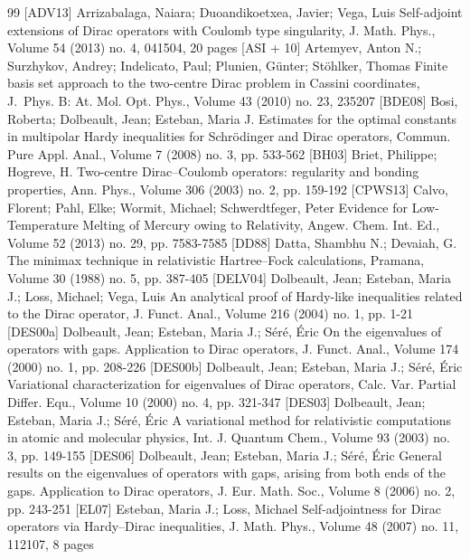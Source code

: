 \documentclass[10pt]{amsart}
\theoremstyle{definition}
\newcommand\1{{\ensuremath {\mathds 1} }}
\begin{document}
\begin{thebibliography}{99}
 [ADV13] Arrizabalaga, Naiara; Duoandikoetxea, Javier; Vega, Luis Self-adjoint extensions of Dirac operators with Coulomb type singularity, J. Math. Phys., Volume 54 (2013) no. 4, 041504, 20 pages
 [ASI + 10] Artemyev, Anton N.; Surzhykov, Andrey; Indelicato, Paul; Plunien, Günter; Stöhlker, Thomas Finite basis set approach to the two-centre Dirac problem in Cassini coordinates, J. Phys. B: At. Mol. Opt. Phys., Volume 43 (2010) no. 23, 235207
 [BDE08] Bosi, Roberta; Dolbeault, Jean; Esteban, Maria J. Estimates for the optimal constants in multipolar Hardy inequalities for Schrödinger and Dirac operators, Commun. Pure Appl. Anal., Volume 7 (2008) no. 3, pp. 533-562
 [BH03] Briet, Philippe; Hogreve, H. Two-centre Dirac–Coulomb operators: regularity and bonding properties, Ann. Phys., Volume 306 (2003) no. 2, pp. 159-192
 [CPWS13] Calvo, Florent; Pahl, Elke; Wormit, Michael; Schwerdtfeger, Peter Evidence for Low-Temperature Melting of Mercury owing to Relativity, Angew. Chem. Int. Ed., Volume 52 (2013) no. 29, pp. 7583-7585
 [DD88] Datta, Shambhu N.; Devaiah, G. The minimax technique in relativistic Hartree–Fock calculations, Pramana, Volume 30 (1988) no. 5, pp. 387-405
 [DELV04] Dolbeault, Jean; Esteban, Maria J.; Loss, Michael; Vega, Luis An analytical proof of Hardy-like inequalities related to the Dirac operator, J. Funct. Anal., Volume 216 (2004) no. 1, pp. 1-21
 [DES00a] Dolbeault, Jean; Esteban, Maria J.; Séré, Éric On the eigenvalues of operators with gaps. Application to Dirac operators, J. Funct. Anal., Volume 174 (2000) no. 1, pp. 208-226
 [DES00b] Dolbeault, Jean; Esteban, Maria J.; Séré, Éric Variational characterization for eigenvalues of Dirac operators, Calc. Var. Partial Differ. Equ., Volume 10 (2000) no. 4, pp. 321-347
 [DES03] Dolbeault, Jean; Esteban, Maria J.; Séré, Éric A variational method for relativistic computations in atomic and molecular physics, Int. J. Quantum Chem., Volume 93 (2003) no. 3, pp. 149-155
 [DES06] Dolbeault, Jean; Esteban, Maria J.; Séré, Éric General results on the eigenvalues of operators with gaps, arising from both ends of the gaps. Application to Dirac operators, J. Eur. Math. Soc., Volume 8 (2006) no. 2, pp. 243-251
 [EL07] Esteban, Maria J.; Loss, Michael Self-adjointness for Dirac operators via Hardy–Dirac inequalities, J. Math. Phys., Volume 48 (2007) no. 11, 112107, 8 pages

\end{thebibliography}
\end{document}
